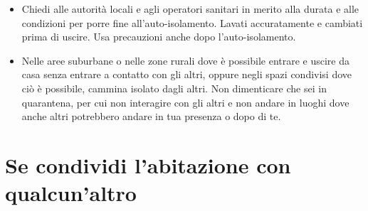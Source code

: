 \documentclass[onecolumn,journal]{IEEEtran}
\begin{document}
\begin{multicols}{2}
\begin{itemize}
  \item Chiedi alle autorità locali e agli operatori sanitari in merito alla durata e alle condizioni per porre fine all'auto-isolamento. Lavati accuratamente e cambiati prima di uscire. Usa precauzioni anche dopo l’auto-isolamento.
  \item Nelle aree suburbane o nelle zone rurali dove è possibile entrare e uscire da casa senza entrare a contatto con gli altri, oppure negli spazi condivisi dove ciò è possibile, cammina isolato dagli altri. Non dimenticare che sei in quarantena, per cui non interagire con gli altri e non andare in luoghi dove anche altri potrebbero andare in tua presenza o dopo di te.

\end{itemize}

\section*{Se condividi l'abitazione con qualcun'altro}

\begin{itemize}


\end{itemize}
\end{multicols}
\end{document}
